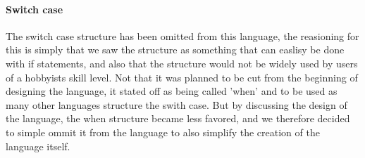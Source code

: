 
\paragraph*{Switch case}
The switch case structure has been omitted from this language, the reasioning for this is simply that we saw the structure as something that can easlisy be done with if statements, and also that the structure would not be widely used by users of a hobbyists skill level. Not that it was planned to be cut from the beginning of designing the language, it stated off as being called 'when' and to be used as many other languages structure the swith case. But by discussing the design of the language, the when structure became less favored, and we therefore decided to simple ommit it from the language to also simplify the creation of the language itself. 
